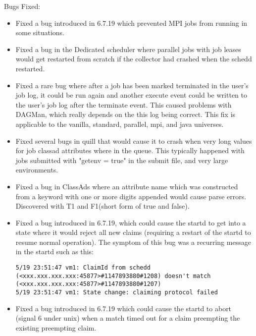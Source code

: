 \noindent Bugs Fixed:

\begin{itemize}

\item Fixed a bug introduced in 6.7.19 which prevented MPI
jobs from running in some situations.

\item Fixed a bug in the Dedicated scheduler where parallel jobs
with job leases would get restarted from scratch if the collector
had crashed when the schedd restarted.

\item Fixed a rare bug where after a job has been marked terminated in the
user's job log, it could be run again and another execute event could be
written to the user's job log after the terminate event.  This caused problems
with DAGMan, which really depends on the this log being correct.  This fix is
applicable to the vanilla, standard, parallel, mpi, and java universes.

\item Fixed several bugs in quill that would cause it to crash when
very long values for job classad attributes where in the queue.  This
typically happened with jobs submitted with "getenv = true" in the
submit file, and very large environments.

\item Fixed a bug in ClassAds where an attribute name which was
constructed from a keyword with one or more digits appended would
cause parse errors. Discovered with T1 and F1(short form of true
and false).

\item Fixed a bug introduced in 6.7.19, which could cause the startd
to get into a state where it would reject all new claims (requiring a
restart of the startd to resume normal operation).  The symptom of
this bug was a recurring message in the startd such as this:

\begin{verbatim}
5/19 23:51:47 vm1: ClaimId from schedd (<xxx.xxx.xxx.xxx:45877>#1147893880#1208) doesn't match (<xxx.xxx.xxx.xxx:45877>#1147893880#1207)
5/19 23:51:47 vm1: State change: claiming protocol failed
\end{verbatim}

\item Fixed a bug introduced in 6.7.19 which could cause the startd to
abort (signal 6 under unix) when a match timed out for a claim
preempting the existing preempting claim.


\end{itemize}
